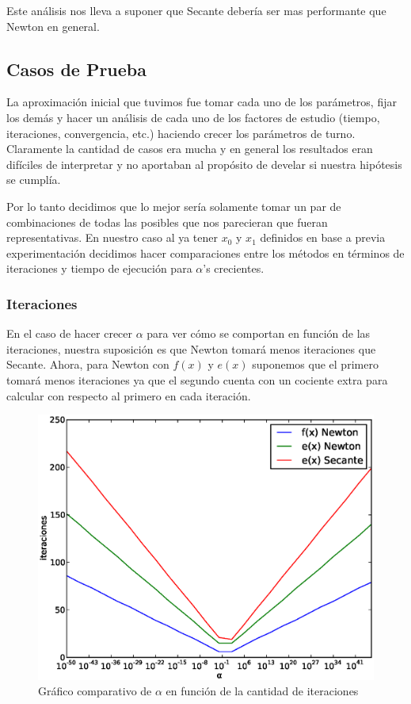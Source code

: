 Este análisis nos lleva a suponer que Secante debería ser mas performante que
Newton en general.

\subsection{Casos de Prueba}
La aproximación inicial que tuvimos fue tomar cada uno de los parámetros, fijar
los demás y hacer un análisis de cada uno de los factores de estudio (tiempo,
iteraciones, convergencia, etc.) haciendo crecer los parámetros de turno.
Claramente la cantidad de casos era mucha y en general los resultados eran
difíciles de interpretar y no aportaban al propósito de develar si nuestra
hipótesis se cumplía.

Por lo tanto decidimos que lo mejor sería solamente tomar un par de
combinaciones de todas las posibles que nos parecieran que fueran
representativas. En nuestro caso al ya tener $x_0$ y $x_1$ definidos en base a
previa experimentación decidimos hacer comparaciones entre los métodos en
términos de iteraciones y tiempo de ejecución para $\alpha$'s crecientes.

\subsubsection{Iteraciones} %
\label{ssub:iteraciones}

En el caso de hacer crecer $\alpha$ para ver cómo se comportan en función de
las iteraciones, nuestra suposición es que Newton tomará menos iteraciones que
Secante. Ahora, para Newton con $f(x)$ y $e(x)$ suponemos que el primero tomará
menos iteraciones ya que el segundo cuenta con un cociente extra para calcular
con respecto al primero en cada iteración.

\begin{figure}[!htbp]
  \begin{center}
    \includegraphics[scale=0.5]{graficos/new/comparacion_iteraciones.eps}
    \caption{\label{fig:comparacion_iteraciones} Gráfico comparativo de $\alpha$ en función de la cantidad de iteraciones}
  \end{center}
\end{figure}

